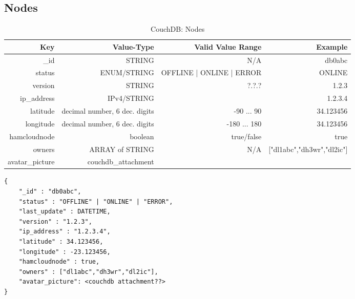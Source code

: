\subsection{Nodes}
\begin{table}[h]
 \caption{CouchDB: Nodes}
 \begin{tabular}{r|r|r|r}
  Key & Value-Type & Valid Value Range & Example \\
  \hline
  \_id & STRING & N/A & db0abc \\
  status & ENUM/STRING & OFFLINE | ONLINE | ERROR & ONLINE \\
  version & STRING & ?.?.? & 1.2.3 \\
  ip\_address & IPv4/STRING & & 1.2.3.4 \\
  latitude & decimal number, 6 dec. digits & -90 ... 90 & 34.123456 \\
  longitude & decimal number, 6 dec. digits & -180 ... 180 & 34.123456 \\
  hamcloudnode & boolean & true/false & true \\
  owners & ARRAY of STRING & N/A & ["dl1abc","dh3wr","dl2ic"] \\
  avatar\_picture & couchdb\_attachment & & \\
  \end{tabular}
  \label{tab:couchdb:nodes}
\end{table}

\begin{lstlisting}
{
	"_id" : "db0abc",
	"status" : "OFFLINE" | "ONLINE" | "ERROR",
	"last_update" : DATETIME,
    "version" : "1.2.3",
    "ip_address" : "1.2.3.4",
    "latitude" : 34.123456,
    "longitude" : -23.123456,
    "hamcloudnode" : true,
    "owners" : ["dl1abc","dh3wr","dl2ic"],
    "avatar_picture": <couchdb attachment??>
}
\end{lstlisting}


